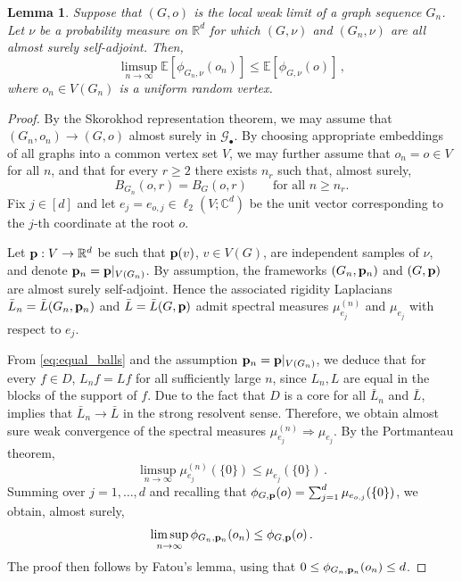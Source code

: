 \documentclass[reqno,english]{amsart}
\numberwithin{equation}{section}
\newtheorem{lemma}[theorem]{Lemma}
\theoremstyle{definition}{
\newtheorem{example}[theorem]{Example}
\newtheorem{definition}[theorem]{Definition}
\newtheorem*{definition*}{Definition}
\newtheorem{problem}[theorem]{Problem}
\newtheorem{question}[theorem]{Question}
}
\newcommand{\E}{\mathbb E}
\newcommand{\R}{\mathbb R}
\newcommand{\C}{\mathbb C}
\newcommand{\cG}{\mathcal G}
\newcommand{\p}{{\bf p}}
\begin{document}
\begin{lemma}\label{lem:upper_semi}
    Suppose that $(G,o)$ is the local weak limit of a graph sequence $G_n$. Let $\nu$ be a probability measure on $\R^d$ for which $(G,\nu)$ and $(G_n,\nu)$ are all almost surely self-adjoint. Then,
    \[
        \limsup_{n\to\infty}\E[\phi_{G_n,\nu}(o_n)]\le \E[\phi_{G,\nu}(o)]\,,
    \]
    where $o_n\in V(G_n)$ is a uniform random vertex.
\end{lemma}
\begin{proof}
     By the Skorokhod representation theorem, we may assume that $(G_n,o_n)\to (G,o)$ almost surely in $\cG_\bullet$. By choosing appropriate embeddings of all graphs into a common vertex set $V$, we may further assume that $o_n=o\in V$ for all $n$, and that for every $r\ge 2$ there exists $n_r$ such that, almost surely,
    \begin{equation}\label{eq:equal_balls}
    B_{G_n}(o,r)=B_G(o,r)\qquad\text{for all } n\ge n_r.
    \end{equation}
    Fix $j\in[d]$ and let $e_j = e_{o,j}\in\ell_2(V;\C^d)$ be the unit vector corresponding to the $j$-th coordinate at the root $o$.

    Let $\p:V\to \R^d$ be such that $\p(v)$, $v\in V(G)$, are independent samples of $\nu$, and denote $\p_n=\p|_{V(G_n)}$.
    By assumption, the frameworks $(G_n,\p_n)$ and $(G,\p)$ are almost surely self-adjoint. Hence the associated rigidity Laplacians $\bar L_n = \bar L(G_n,\p_n)$ and $\bar L = \bar L(G,\p)$ admit spectral measures $\mu^{(n)}_{e_{j}}$ and $\mu_{e_{j}}$ with respect to $e_{j}$.

From \eqref{eq:equal_balls} and the assumption $\p_n=\p|_{V(G_n)}$, we deduce that for every \(f\in D\), \(L_n f=Lf\) for all sufficiently large \(n\),
since $L_n,L$ are equal in the blocks of the support of $f$. 
Due to the fact that \(D\) is a core for all \(\bar L_n\) and \(\bar L\), \cite[Theorem VIII.25(a)]{ReedSimonI} implies that \(\bar L_n\to \bar L\) in the strong resolvent sense. Therefore, we obtain almost sure weak convergence of the spectral measures $\mu^{(n)}_{e_{j}}\Rightarrow \mu_{e_{j}}$. By the Portmanteau theorem,
    \[
        \limsup_{n\to\infty}\mu^{(n)}_{e_{j}}(\{0\})\le \mu_{e_{j}}(\{0\})\,.
    \]
    Summing over $j=1,\dots,d$ and recalling that $\phi_{G,\p}(o)=\sum_{j=1}^d \mu_{e_{o,j}}(\{0\})$, we obtain, almost surely,
    \[
        \limsup_{n\to\infty}\phi_{G_n,\p_n}(o_n)\le \phi_{G,\p}(o)\,.
    \]
    The proof then follows by Fatou's lemma, using that $0\le \phi_{G_n,\p_n}(o_n)\le d$.
\end{proof}
\end{document}
